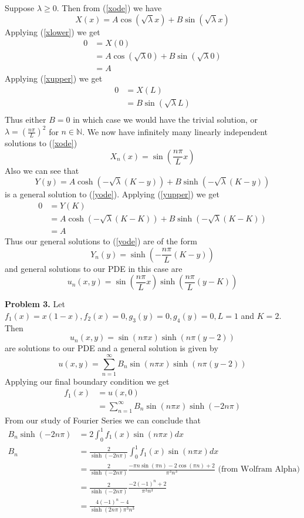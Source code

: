 \documentclass[12pt]{article}
\newcommand{\problem}[1]{\hspace{-4 ex} \large \textbf{Problem #1} }
\newcommand{\NN}{\mathbb{N}}
\begin{document}
Suppose $\lambda \geq 0$. Then from (\ref{xode}) we have
$$
X(x) = A\cos(\sqrt{\lambda}x) + B \sin(\sqrt{\lambda}x)
$$
Applying (\ref{xlower}) we get
\begin{align*}
0 & = X(0) \\
& = A\cos(\sqrt{\lambda}0) + B \sin(\sqrt{\lambda}0) \\
& = A
\end{align*}
Applying (\ref{xupper}) we get
\begin{align*}
0 & = X(L) \\
& = B \sin(\sqrt{\lambda}L) \\
\end{align*}
Thus either $B=0$ in which case we would have the trivial solution, or $\lambda = \left( \frac{n\pi}{L} \right)^2$ for $n \in \NN$. We now have infinitely many linearly independent solutions to (\ref{xode})
$$
X_n(x) = \sin \left( \frac{n\pi}{L}x \right)
$$
Also we can see that
$$
Y(y) = A\cosh(-\sqrt{\lambda}(K-y)) + B \sinh(-\sqrt{\lambda}(K-y))
$$
is a general solution to (\ref{yode}). Applying (\ref{yupper}) we get
\begin{align*}
	0 & = Y(K) \\
	& = A\cosh(-\sqrt{\lambda}(K-K)) + B \sinh(-\sqrt{\lambda}(K-K)) \\
	& = A
\end{align*}
Thus our general solutions to (\ref{yode}) are of the form
$$
Y_n(y) = \sinh \left( -\frac{n\pi}{L}(K-y) \right)
$$
and general solutions to our PDE in this case are
$$
u_n(x,y) = \sin \left( \frac{n\pi}{L}x \right) \sinh \left( \frac{n\pi}{L}(y - K) \right)
$$

\problem{3. } Let $f_1(x) = x(1-x), f_2(x) = 0, g_3(y)=0, g_4(y)=0, L=1$ and $K=2$. Then 
$$
u_n(x,y) = \sin( n\pi x ) \sinh( n\pi(y - 2) )
$$
are solutions to our PDE and a general solution is given by
$$
u(x,y) = \sum\limits_{n=1}^\infty B_n\sin( n\pi x ) \sinh( n\pi(y - 2))
$$
Applying our final boundary condition we get
\begin{align*}
f_1(x) & = u(x,0) \\
& = \sum\limits_{n=1}^\infty B_n \sin( n\pi x ) \sinh( -2 n\pi)
\end{align*}
From our study of Fourier Series we can conclude that
\begin{align*}
	B_n \sinh( -2 n\pi) & = 2 \int_0^1 f_1(x) \sin( n\pi x ) dx \\
	B_n & = \frac{2}{\sinh( -2 n\pi)} \int_0^1 f_1(x) \sin( n\pi x ) dx \\
	& = \frac{2}{\sinh( -2 n\pi)} \frac{-\pi n \sin(\pi n) - 2 \cos(\pi n) + 2}{\pi^3 n^3} \text{\ \ (from Wolfram Alpha)} \\
	& = \frac{2}{\sinh( -2 n\pi)} \frac{- 2 (-1)^n + 2}{\pi^3 n^3} \\
	& = \frac{4 (-1)^n - 4 }{\sinh( 2 n\pi) \pi^3 n^3} \\
\end{align*}
\end{document}

